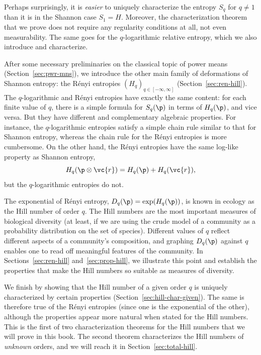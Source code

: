 Perhaps surprisingly, it is \emph{easier} to uniquely characterize the
entropy $S_q$ for $q \neq 1$ than it is in the Shannon case $S_1 = H$.
Moreover, the characterization theorem that we prove does not require any
regularity conditions at all, not even measurability.  The same goes for
the $q$-logarithmic relative entropy, which we also introduce and
characterize. 

After some necessary preliminaries on the classical topic of power means
(Section~\ref{sec:pwr-mns}), we introduce the other main family of
deformations of Shannon entropy: the R\'enyi entropies $(H_q)_{q \in
  [-\infty, \infty]}$ (Section~\ref{sec:ren-hill}).  The
$q$-logarithmic and R\'enyi entropies have exactly the same content: for
each finite value of $q$, there is a simple formula for $S_q(\p)$ in terms
of $H_q(\p)$, and vice versa.  But they have different and complementary
algebraic properties.  For instance, the $q$-logarithmic entropies satisfy
a simple chain rule similar to that for Shannon entropy, whereas the chain
rule for the R\'enyi entropies is more cumbersome.  On the other hand,
the R\'enyi entropies have the same log-like property as Shannon
entropy, 
\[
H_q(\p \otimes \vc{r}) = H_q(\p) + H_q(\vc{r}),
\]
but the $q$-logarithmic entropies do not.

The exponential of R\'enyi entropy, $D_q(\p) = \exp(H_q(\p))$, is known in
ecology as the Hill number of order $q$.  The Hill numbers are the most
important measures of biological diversity (at least, if we are using the
crude model of a community as a probability distribution on the set of
species).  Different values of $q$ reflect different aspects of a
community's composition, and graphing $D_q(\p)$ against $q$ enables one to
read off meaningful features of the community.  In
Sections~\ref{sec:ren-hill} and~\ref{sec:prop-hill}, we illustrate this
point and establish the properties that make the Hill numbers so suitable
as measures of diversity.

We finish by showing that the Hill number of a given order $q$ is uniquely
characterized by certain properties (Section~\ref{sec:hill-char-given}).
The same is therefore true of the R\'enyi entropies (since one is the
exponential of the other), although the properties appear more natural when
stated for the Hill numbers.  This is the first of two characterization
theorems for the Hill numbers that we will prove in this book.  The second
theorem characterizes the Hill numbers of \emph{unknown} orders, and we will
reach it in Section~\ref{sec:total-hill}.


